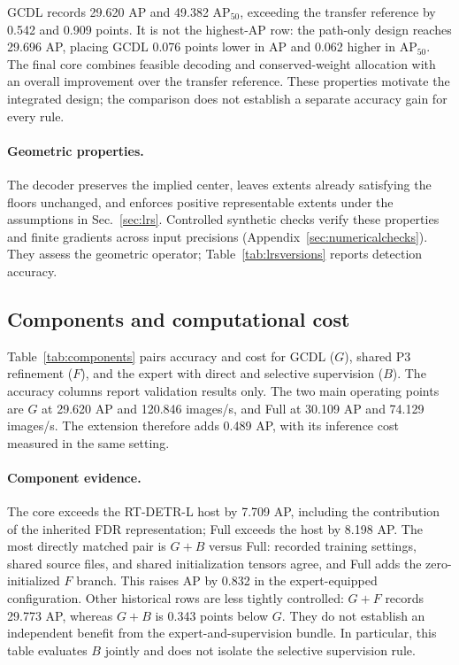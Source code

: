 
GCDL records 29.620 AP and 49.382 $\mathrm{AP}_{50}$, exceeding the transfer reference by 0.542 and 0.909 points. It is not the highest-AP row: the path-only design reaches 29.696 AP, placing GCDL 0.076 points lower in AP and 0.062 higher in $\mathrm{AP}_{50}$. The final core combines feasible decoding and conserved-weight allocation with an overall improvement over the transfer reference. These properties motivate the integrated design; the comparison does not establish a separate accuracy gain for every rule.

\paragraph{Geometric properties.}
The decoder preserves the implied center, leaves extents already satisfying the floors unchanged, and enforces positive representable extents under the assumptions in Sec.~\ref{sec:lrs}. Controlled synthetic checks verify these properties and finite gradients across input precisions (Appendix~\ref{sec:numericalchecks}). They assess the geometric operator; Table~\ref{tab:lrsversions} reports detection accuracy.

\subsection{Components and computational cost}
\label{sec:componentcost}
Table~\ref{tab:components} pairs accuracy and cost for GCDL ($G$), shared P3 refinement ($F$), and the expert with direct and selective supervision ($B$). The accuracy columns report validation results only. The two main operating points are $G$ at 29.620 AP and 120.846 images/s, and Full at 30.109 AP and 74.129 images/s. The extension therefore adds 0.489 AP, with its inference cost measured in the same setting.


\paragraph{Component evidence.}
The core exceeds the RT-DETR-L host by 7.709 AP, including the contribution of the inherited FDR representation; Full exceeds the host by 8.198 AP. The most directly matched pair is $G+B$ versus Full: recorded training settings, shared source files, and shared initialization tensors agree, and Full adds the zero-initialized $F$ branch. This raises AP by 0.832 in the expert-equipped configuration. Other historical rows are less tightly controlled: $G+F$ records 29.773 AP, whereas $G+B$ is 0.343 points below $G$. They do not establish an independent benefit from the expert-and-supervision bundle. In particular, this table evaluates $B$ jointly and does not isolate the selective supervision rule.


